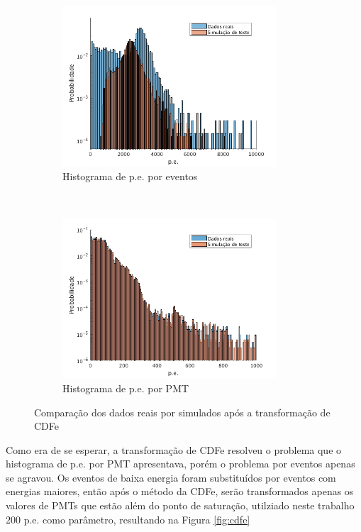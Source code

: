 \begin{figure}[ht]
	\centering
	\begin{subfigure}{0.5\textwidth}
		\centering
		\includegraphics[width=8cm]{textuais/simulacao/figuras/hist_evt2.png}
		\caption{Histograma de p.e. por eventos}
		\label{fig:a2}
	\end{subfigure}%
	~ 
	\begin{subfigure}{0.5\textwidth}
		\centering
		\includegraphics[width=8cm]{textuais/simulacao/figuras/hist_pmt2.png}
		\caption{Histograma de p.e. por PMT}
		\label{fig:b2}
	\end{subfigure}
	\caption{Comparação dos dados reais por simulados após a transformação de CDFe}
\end{figure}

Como era de se esperar, a transformação de CDFe resolveu o problema que o histograma de p.e. por PMT apresentava, porém o problema por eventos apenas se agravou. Os eventos de baixa energia foram substituídos por eventos com energias maiores, então após o método da CDFe, serão transformados apenas os valores de PMTs que estão além do ponto de saturação, utilziado neste trabalho $200$ p.e. como parâmetro, resultando na Figura \ref{fig:cdfe}

